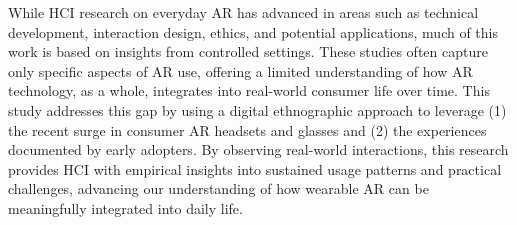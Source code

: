 While HCI research on everyday AR has advanced in areas such as technical development, interaction design, ethics, and potential applications, much of this work is based on insights from controlled settings. These studies often capture only specific aspects of AR use, offering a limited understanding of how AR technology, as a whole, integrates into real-world consumer life over time. This study addresses this gap by using a digital ethnographic approach to leverage (1) the recent surge in consumer AR headsets and glasses and (2) the experiences documented by early adopters. By observing real-world interactions, this research provides HCI with empirical insights into sustained usage patterns and practical challenges, advancing our understanding of how wearable AR can be meaningfully integrated into daily life.